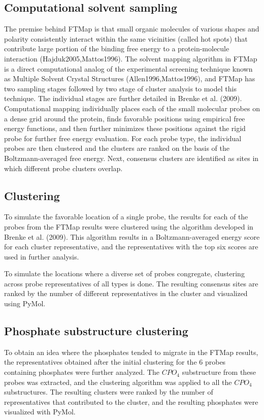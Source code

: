 \documentclass[11pt,a4paper]{article}
\begin{document}
\subsection{Computational solvent sampling}
The premise behind FTMap is that small organic molecules 
of various shapes and polarity consistently interact within
the same vicinities (called hot spots) that contribute large portion
of the binding free energy to a protein-molecule interaction (Hajduk2005,Mattos1996). The solvent 
mapping algorithm in FTMap \cite{Brenke2009} is a direct computational analog of the experimental 
screening technique known as Multiple Solvent Crystal Structures (Allen1996,Mattos1996), and 
FTMap has two sampling stages followed by two stage of cluster 
analysis to model this technique. The individual stages are further detailed in Brenke et al. (2009).
Computational mapping individually places each of the small molecular 
probes on a dense grid around the protein, finds 
favorable positions using empirical free energy functions, and then further minimizes
these positions against the rigid probe for further free energy evaluation. 
For each probe type, the 
individual probes are then clustered and the clusters are ranked on the basis of the 
Boltzmann-averaged 
free energy. Next, consensus clusters are identified as sites in which different probe 
clusters overlap. 

\subsection{Clustering}
	To simulate the favorable location of a single probe, the results for each of the probes from the FTMap results were clustered using the algorithm 
	developed in Brenke et al. (2009).  This algorithm results in a Boltzmann-averaged energy score for each cluster representative, and the representatives 
	with the top six scores are used in further analysis.
	
	To simulate the locations where a diverse set of probes congregate, clustering across probe representatives of all types is done.  The resulting consensus
	sites are ranked by the number of different representatives in the cluster and visualized using PyMol. 

\subsection{Phosphate substructure clustering}
	To obtain an idea where the phosphates tended to migrate in the FTMap results, the representatives obtained after the initial clustering for the 6 probes 
	containing phosphates were further analyzed.  The $CPO_4$ substructure from these
	probes was extracted, and the clustering algorithm was applied to all the $CPO_4$ substructures.  The resulting clusters were ranked by the 
	number of representatives that contributed to the cluster, and the resulting phosphates were visualized with PyMol.
\end{document}
